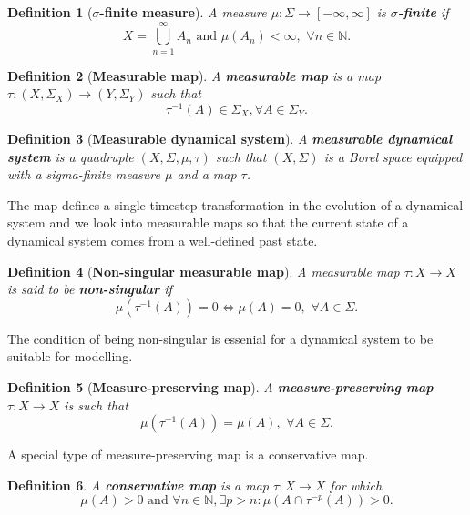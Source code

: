 \documentclass[]{article}
\newtheorem{definition}{Definition}
\begin{document}
\begin{definition}[\textbf{$\sigma$-finite measure}]
A measure $\mu: \Sigma \to [-\infty,\infty]$ is \textbf{$\sigma$-finite} if
\begin{equation}
	X=\bigcup_{n=1}^{\infty} A_n \,\, \text{and} \,\, \mu(A_n) < \infty, \,\, \forall n \in \mathbb{N}.
\end{equation}
\end{definition}
\begin{definition}[\textbf{Measurable map}]
A \textbf{measurable map} is a map $\tau: (X,\Sigma_X) \to (Y, \Sigma_Y)$ such that 
\begin{equation}
	\tau^{-1}(A) \in \Sigma_X, \forall A \in \Sigma_Y.
\end{equation}
\end{definition}
\begin{definition}[\textbf{Measurable dynamical system}]
A \textbf{measurable dynamical system} is a quadruple $(X,\Sigma,\mu,\tau)$ such that $(X,\Sigma)$ is a Borel space equipped with a sigma-finite measure $\mu$ and a map $\tau$.
\end{definition}
The map defines a single timestep transformation in the evolution of a dynamical system and we look into measurable maps so that the current state of a dynamical system comes from a well-defined past state.
\begin{definition}[\textbf{Non-singular measurable map}]
A measurable map $\tau:X \to X$ is said to be \textbf{non-singular} if 
\begin{equation}
	\mu(\tau^{-1}(A))=0 \iff \mu(A)=0, \,\, \forall A \in \Sigma.
\end{equation}
\end{definition}
The condition of being non-singular is essenial for a dynamical system to be suitable for modelling.
\begin{definition}[\textbf{Measure-preserving map}]
A \textbf{measure-preserving map} $\tau:X \to X$ is such that
\begin{equation}
	\mu(\tau^{-1}(A))=\mu(A), \,\, \forall A \in \Sigma.
\end{equation}
\end{definition}
A special type of measure-preserving map is a conservative map.
\begin{definition}
A \textbf{conservative map} is a map $\tau:X \to X$ for which
\begin{equation}
	\mu(A) > 0 \,\, \text{and} \,\, \forall n \in \mathbb{N}, \exists p > n: \mu(A \cap \tau^{-p}(A)) > 0.
\end{equation}
\end{definition}
\end{document}
